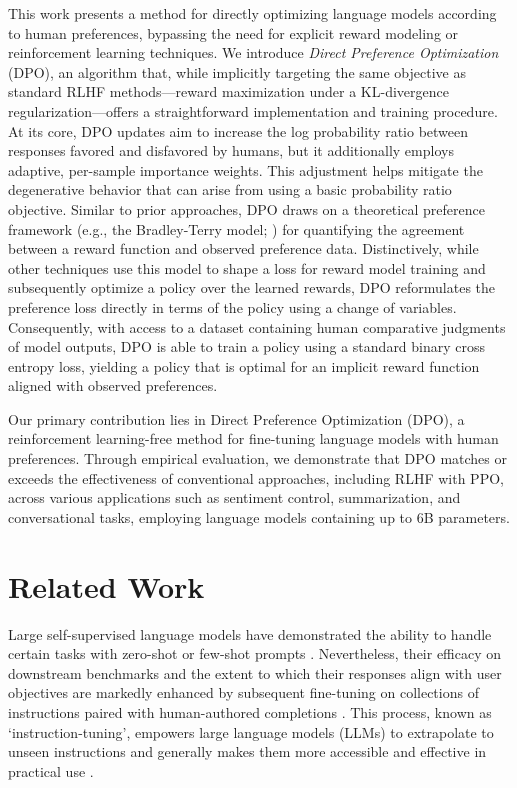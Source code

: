 This work presents a method for directly optimizing language models according to human preferences, bypassing the need for explicit reward modeling or reinforcement learning techniques. We introduce \textit{Direct Preference Optimization} (DPO), an algorithm that, while implicitly targeting the same objective as standard RLHF methods—reward maximization under a KL-divergence regularization—offers a straightforward implementation and training procedure. At its core, DPO updates aim to increase the log probability ratio between responses favored and disfavored by humans, but it additionally employs adaptive, per-sample importance weights. This adjustment helps mitigate the degenerative behavior that can arise from using a basic probability ratio objective. Similar to prior approaches, DPO draws on a theoretical preference framework (e.g., the Bradley-Terry model; \cite{bradley1952rankanalysis}) for quantifying the agreement between a reward function and observed preference data. Distinctively, while other techniques use this model to shape a loss for reward model training and subsequently optimize a policy over the learned rewards, DPO reformulates the preference loss directly in terms of the policy using a change of variables. Consequently, with access to a dataset containing human comparative judgments of model outputs, DPO is able to train a policy using a standard binary cross entropy loss, yielding a policy that is optimal for an implicit reward function aligned with observed preferences.

Our primary contribution lies in Direct Preference Optimization (DPO), a reinforcement learning-free method for fine-tuning language models with human preferences. Through empirical evaluation, we demonstrate that DPO matches or exceeds the effectiveness of conventional approaches, including RLHF with PPO, across various applications such as sentiment control, summarization, and conversational tasks, employing language models containing up to 6B parameters.

\section{Related Work}

Large self-supervised language models have demonstrated the ability to handle certain tasks with zero-shot \citep{radford2019language} or few-shot prompts \citep{gpt3,megatron,chowdhery2022palm}. Nevertheless, their efficacy on downstream benchmarks and the extent to which their responses align with user objectives are markedly enhanced by subsequent fine-tuning on collections of instructions paired with human-authored completions \citep{mishra-etal-2022-cross,sanh2022multitask,chung2022scaling,thoppilan2022lamda}. This process, known as `instruction-tuning', empowers large language models (LLMs) to extrapolate to unseen instructions and generally makes them more accessible and effective in practical use \citep{chung2022scaling}. 

